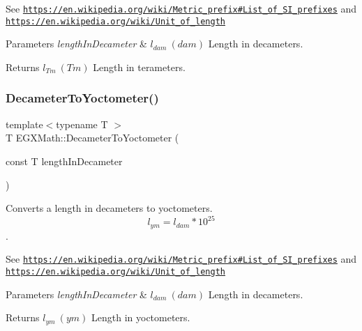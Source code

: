See \href{https://en.wikipedia.org/wiki/Metric_prefix#List_of_SI_prefixes}{\tt https\+://en.\+wikipedia.\+org/wiki/\+Metric\+\_\+prefix\#\+List\+\_\+of\+\_\+\+S\+I\+\_\+prefixes} and \href{https://en.wikipedia.org/wiki/Unit_of_length}{\tt https\+://en.\+wikipedia.\+org/wiki/\+Unit\+\_\+of\+\_\+length} 
\begin{DoxyParams}{Parameters}
{\em length\+In\+Decameter} & $ l_{dam}\ (dam)$ Length in decameters. \\
\hline
\end{DoxyParams}
\begin{DoxyReturn}{Returns}
$ l_{Tm}\ (Tm)$ Length in terameters. 
\end{DoxyReturn}
\mbox{\label{group___e_g_x_math-_conversions-_length_conversions-_s_i-_decameter-_s_i_ga1e90c34b56ee230eec4a3e00a3fedbde}} 
\subsubsection{\texorpdfstring{Decameter\+To\+Yoctometer()}{DecameterToYoctometer()}}
{\footnotesize\ttfamily template$<$typename T $>$ \\
T E\+G\+X\+Math\+::\+Decameter\+To\+Yoctometer (\begin{DoxyParamCaption}\item[{const T}]{length\+In\+Decameter }\end{DoxyParamCaption})}



Converts a length in decameters to yoctometers. \[ l_{ym}=l_{dam} * 10^{25} \]. 

See \href{https://en.wikipedia.org/wiki/Metric_prefix#List_of_SI_prefixes}{\tt https\+://en.\+wikipedia.\+org/wiki/\+Metric\+\_\+prefix\#\+List\+\_\+of\+\_\+\+S\+I\+\_\+prefixes} and \href{https://en.wikipedia.org/wiki/Unit_of_length}{\tt https\+://en.\+wikipedia.\+org/wiki/\+Unit\+\_\+of\+\_\+length} 
\begin{DoxyParams}{Parameters}
{\em length\+In\+Decameter} & $ l_{dam}\ (dam)$ Length in decameters. \\
\hline
\end{DoxyParams}
\begin{DoxyReturn}{Returns}
$ l_{ym}\ (ym)$ Length in yoctometers. 
\end{DoxyReturn}
\mbox{\label{group___e_g_x_math-_conversions-_length_conversions-_s_i-_decameter-_s_i_gaa10c7c9c4e75fc2d647d4f85ff8d801b}} 

